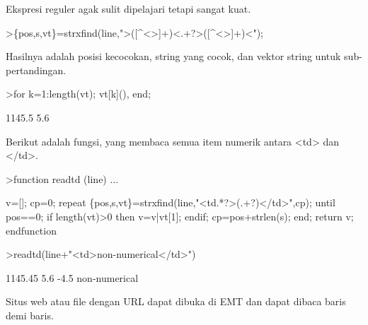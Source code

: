 \documentclass{article}
\begin{document}
\begin{eulernotebook}
\begin{eulercomment}
\begin{eulercomment}
\begin{eulercomment}
Ekspresi reguler agak sulit dipelajari tetapi sangat kuat.
\end{eulercomment}
\begin{eulerprompt}
>\{pos,s,vt\}=strxfind(line,">([^<>]+)<.+?>([^<>]+)<");
\end{eulerprompt}
\begin{eulercomment}
Hasilnya adalah posisi kecocokan, string yang cocok, dan vektor string
untuk sub-pertandingan.
\end{eulercomment}
\begin{eulerprompt}
>for k=1:length(vt); vt[k](), end;
\end{eulerprompt}
\begin{euleroutput}
  1145.5
  5.6
\end{euleroutput}
\begin{eulercomment}
Berikut adalah fungsi, yang membaca semua item numerik antara \textless{}td\textgreater{} dan
\textless{}/td\textgreater{}.
\end{eulercomment}
\begin{eulerprompt}
>function readtd (line) ...
\end{eulerprompt}
\begin{eulerudf}
  v=[]; cp=0;
  repeat
     \{pos,s,vt\}=strxfind(line,"<td.*?>(.+?)</td>",cp);
     until pos==0;
     if length(vt)>0 then v=v|vt[1]; endif;
     cp=pos+strlen(s);
  end;
  return v;
  endfunction
\end{eulerudf}
\begin{eulerprompt}
>readtd(line+"<td>non-numerical</td>")
\end{eulerprompt}
\begin{euleroutput}
  1145.45
  5.6
  -4.5
  non-numerical
\end{euleroutput}
\begin{eulercomment}
Situs web atau file dengan URL dapat dibuka di EMT dan dapat dibaca
baris demi baris.


\end{eulercomment}
\end{eulercomment}
\end{eulercomment}
\end{eulernotebook}
\end{document}
